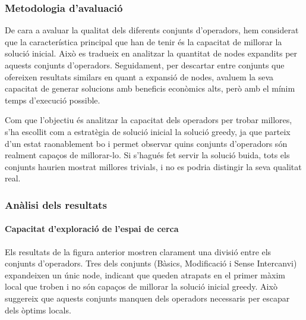 \vspace{0.5cm}


\subsubsection{Metodologia d'avaluació}

De cara a avaluar la qualitat dels diferents conjunts d'operadors, hem considerat que la característica principal que han de tenir és la capacitat de millorar la solució inicial. Això es tradueix en analitzar la quantitat de nodes expandits per aquests conjunts d'operadors. Seguidament, per descartar entre conjunts que ofereixen resultats similars en quant a expansió de nodes, avaluem la seva capacitat de generar solucions amb beneficis econòmics alts, però amb el mínim temps d'execució possible.

\vspace{0.2cm}

Com que l'objectiu és analitzar la capacitat dels operadors per trobar millores, s'ha escollit com a estratègia de solució inicial la solució greedy, ja que parteix d'un estat raonablement bo i permet observar quins conjunts d'operadors són realment capaços de millorar-lo. Si s'hagués fet servir la solució buida, tots els conjunts haurien mostrat millores trivials, i no es podria distingir la seva qualitat real.

\vspace{0.5cm}


\subsubsection{Anàlisi dels resultats}

\paragraph{Capacitat d'exploració de l'espai de cerca}

\vspace{0.5cm}

\vspace{0.5cm}

Els resultats de la figura anterior mostren clarament una divisió entre els conjunts d'operadors. Tres dels conjunts (Bàsics, Modificació i Sense Intercanvi) expandeixen un únic node, indicant que queden atrapats en el primer màxim local que troben i no són capaços de millorar la solució inicial greedy. Això suggereix que aquests conjunts manquen dels operadors necessaris per escapar dels òptims locals.

